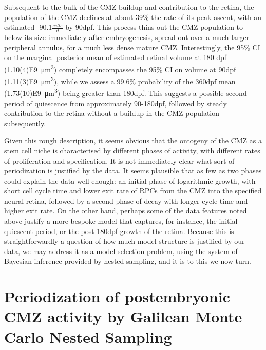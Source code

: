 Subsequent to the bulk of the CMZ buildup and contribution to the retina, the population of the CMZ declines at about 39\% the rate of its peak ascent, with an estimated -90.1$\frac{cells}{d}$ by 90dpf. This process thins out the CMZ population to below its size immediately after embryogenesis, spread out over a much larger peripheral annulus, for a much less dense mature CMZ. Interestingly, the 95\% CI on the marginal posterior mean of estimated retinal volume at 180 dpf (\SI{1.10(4)E9}{\cubic\micro\metre}) completely encompasses the 95\% CI on volume at 90dpf (\SI{1.11(3)E9}{\cubic\micro\metre}), while we assess a 99.6\% probability of the 360dpf mean (\SI{1.73(10)E9}{\cubic\micro\metre}) being greater than 180dpf. This suggests a possible second period of quiescence from approximately 90-180dpf, followed by steady contribution to the retina without a buildup in the CMZ population subsequently.

Given this rough description, it seems obvious that the ontogeny of the CMZ as a stem cell niche is characterised by different phases of activity, with different rates of proliferation and specification. It is not immediately clear what sort of periodization is justified by the data. It seems plausible that as few as two phases could explain the data well enough: an initial phase of logarithmic growth, with short cell cycle time and lower exit rate of RPCs from the CMZ into the specified neural retina, followed by a second phase of decay with longer cycle time and higher exit rate. On the other hand, perhaps some of the data features noted above justify a more bespoke model that captures, for instance, the initial quiescent period, or the post-180dpf growth of the retina. Because this is straightforwardly a question of how much model structure is justified by our data, we may address it as a model selection problem, using the system of Bayesian inference provided by nested sampling, and it is to this we now turn.

\section{Periodization of postembryonic CMZ activity by Galilean Monte Carlo Nested Sampling}

